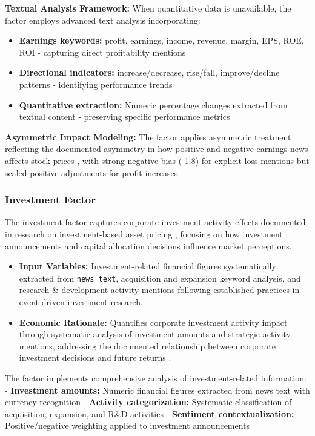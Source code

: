 \documentclass[3p,times,procedia]{elsarticle}
\begin{document}
\textbf{Textual Analysis Framework:} When quantitative data is unavailable, the factor employs advanced text analysis incorporating:

\begin{itemize}
    \item \textbf{Earnings keywords:} profit, earnings, income, revenue, margin, EPS, ROE, ROI - capturing direct profitability mentions
    \item \textbf{Directional indicators:} increase/decrease, rise/fall, improve/decline patterns - identifying performance trends
    \item \textbf{Quantitative extraction:} Numeric percentage changes extracted from textual content - preserving specific performance metrics
\end{itemize}

\textbf{Asymmetric Impact Modeling:} The factor applies asymmetric treatment reflecting the documented asymmetry in how positive and negative earnings news affects stock prices \cite{Kothari2009}, with strong negative bias (-1.8) for explicit loss mentions but scaled positive adjustments for profit increases.

\subsubsection{{Investment Factor}}

The investment factor captures corporate investment activity effects documented in research on investment-based asset pricing \cite{Daniel1998}, focusing on how investment announcements and capital allocation decisions influence market perceptions.

\begin{itemize}
    \item \textbf{Input Variables:} Investment-related financial figures systematically extracted from \texttt{news\_text}, acquisition and expansion keyword analysis, and research \& development activity mentions following established practices in event-driven investment research.
    \item \textbf{Economic Rationale:} Quantifies corporate investment activity impact through systematic analysis of investment amounts and strategic activity mentions, addressing the documented relationship between corporate investment decisions and future returns \cite{Daniel1998}.
\end{itemize}

The factor implements comprehensive analysis of investment-related information:
- \textbf{Investment amounts:} Numeric financial figures extracted from news text with currency recognition
- \textbf{Activity categorization:} Systematic classification of acquisition, expansion, and R\&D activities
- \textbf{Sentiment contextualization:} Positive/negative weighting applied to investment announcements
\end{document}
